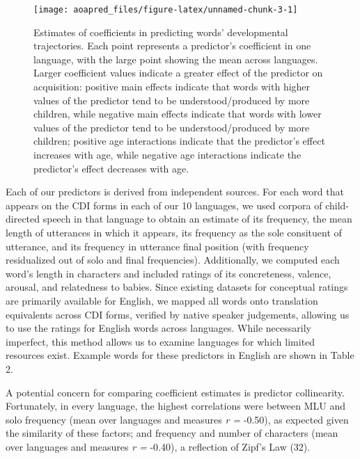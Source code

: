 \documentclass[english,man]{apa6}
\theoremstyle{definition}
\theoremstyle{definition}
\theoremstyle{definition}
\theoremstyle{remark}
\begin{document}
\begin{figure*}

{\centering \texttt{[image: aoapred\_files/figure-latex/unnamed-chunk-3-1]} 

}

\caption{Estimates of coefficients in predicting words' developmental trajectories. Each point represents a predictor's coefficient in one language, with the large point showing the mean across languages. Larger coefficient values indicate a greater effect of the predictor on acquisition: positive main effects indicate that words with higher values of the predictor tend to be understood/produced by more children, while negative main effects indicate that words with lower values of the predictor tend to be understood/produced by more children; positive age interactions indicate that the predictor's effect increases with age, while negative age interactions indicate the predictor's effect decreases with age.}\label{fig:unnamed-chunk-3}
\end{figure*}

Each of our predictors is derived from independent sources. For each
word that appears on the CDI forms in each of our 10 languages, we used
corpora of child-directed speech in that language to obtain an estimate
of its frequency, the mean length of utterances in which it appears, its
frequency as the sole consituent of utterance, and its frequency in
utterance final position (with frequency residualized out of solo and
final frequencies). Additionally, we computed each word's length in
characters and included ratings of its concreteness, valence, arousal,
and relatedness to babies. Since existing datasets for conceptual
ratings are primarily available for English, we mapped all words onto
translation equivalents across CDI forms, verified by native speaker
judgements, allowing us to use the ratings for English words across
languages. While necessarily imperfect, this method allows us to examine
languages for which limited resources exist. Example words for these
predictors in English are shown in Table 2.

A potential concern for comparing coefficient estimates is predictor
collinearity. Fortunately, in every language, the highest correlations
were between MLU and solo frequency (mean over languages and measures
\emph{r = } -0.50), as expected given the similarity of these factors;
and frequency and number of characters (mean over languages and measures
\emph{r = } -0.40), a reflection of Zipf's Law (32).
\end{document}
